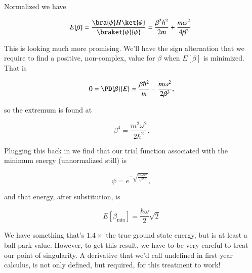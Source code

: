 Normalized we have

\begin{equation}\label{eqn:variationHarmonicOscillator:390}
E[\beta] = \frac{\bra{\psi} H \ket{\psi}}{\braket{\psi}{\psi}} = \frac{\beta^2 \hbar^2}{2m} + \frac{m \omega^2}{4 \beta^2}.
\end{equation}

This is looking much more promising.  We'll have the sign alternation that we require to find a positive, non-complex, value for $\beta$ when $E[\beta]$ is minimized.  That is

\begin{equation}\label{eqn:variationHarmonicOscillator:410}
0 = \PD{\beta}{E} = 
\frac{\beta \hbar^2}{m} - \frac{m \omega^2}{2 \beta^3},
\end{equation}

so the extremum is found at 

\begin{equation}\label{eqn:variationHarmonicOscillator:430}
\beta^4 = \frac{m^2 \omega^2}{2 \hbar^2}.
\end{equation}

Plugging this back in we find that our trial function associated with the minimum energy (unnormalized still) is

\begin{equation}\label{eqn:variationHarmonicOscillator:450}
\psi = e^{-\sqrt{\frac{m \omega x^2}{\sqrt{2} \hbar}}},
\end{equation}

and that energy, after substitution, is

\begin{equation}\label{eqn:variationHarmonicOscillator:470}
E[\beta_{\text{min}}] = \frac{\hbar \omega}{2} \sqrt{2}
\end{equation}

We have something that's $1.4 \times$ the true ground state energy, but is at least a ball park value.  However, to get this result, we have to be very careful to treat our point of singularity.  A derivative that we'd call undefined in first year calculus, is not only defined, but required, for this treatment to work!

\EndArticle

